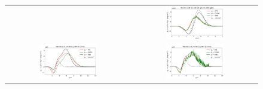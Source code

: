 \documentclass[
 aps,
 jmp,
 amsmath,amssymb,
 twocolumn,
]{revtex4-1}
\newcommand{\figscale}{0.48}
\begin{document}
\begin{figure}[htb]
\begin{center}
\begin{tabular}{cc}
	  &
      \includegraphics[width=\figscale\textwidth]{C7_Calder_case5_kinetics.png} 
	  \\
 \includegraphics[width=\figscale\textwidth]{C7_Aladin_case5_nonlocal_kinetics.png} 
      &  \includegraphics[width=\figscale\textwidth]{C7_Calder_case5_nonlocal_kinetics.png}
	\end{tabular}

\end{center}
\end{figure}
\end{document}

